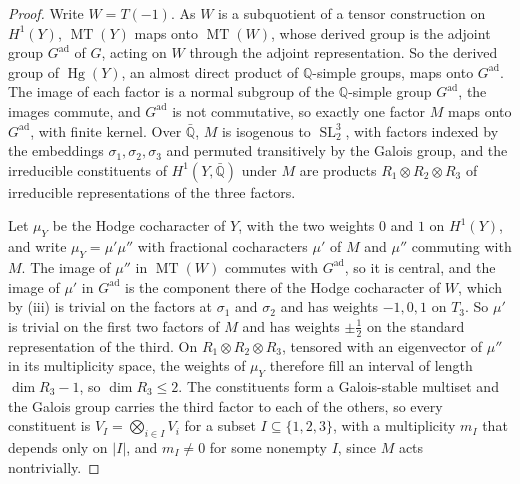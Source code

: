 \documentclass[11pt,reqno]{amsart}
\theoremstyle{plain}
\theoremstyle{definition}
\theoremstyle{remark}
\newcommand{\QQ}{\mathbb{Q}}
\DeclareMathOperator{\MT}{MT}
\DeclareMathOperator{\Hg}{Hg}
\DeclareMathOperator{\SL}{SL}
\begin{document}
\begin{proof}
Write $W=T(-1)$. As $W$ is a subquotient of a tensor construction on
$H^{1}(Y)$, $\MT(Y)$ maps onto $\MT(W)$, whose derived group is the adjoint
group $G^{\mathrm{ad}}$ of $G$, acting on $W$ through the adjoint
representation. So the derived group of $\Hg(Y)$, an almost direct product of
$\QQ$-simple groups, maps onto $G^{\mathrm{ad}}$. The image of each factor is
a normal subgroup of the $\QQ$-simple group $G^{\mathrm{ad}}$, the images
commute, and $G^{\mathrm{ad}}$ is not commutative, so exactly one factor $M$
maps onto $G^{\mathrm{ad}}$, with finite kernel. Over $\bar{\QQ}$, $M$ is
isogenous to $\SL_{2}^{3}$, with factors indexed by the embeddings
$\sigma_{1},\sigma_{2},\sigma_{3}$ and permuted transitively by the Galois
group, and the irreducible constituents of $H^{1}(Y,\bar{\QQ})$ under $M$ are
products $R_{1}\otimes R_{2}\otimes R_{3}$ of irreducible representations of
the three factors.

Let $\mu_{Y}$ be the Hodge cocharacter of $Y$, with the two weights $0$ and
$1$ on $H^{1}(Y)$, and write $\mu_{Y}=\mu'\mu''$ with fractional cocharacters
$\mu'$ of $M$ and $\mu''$ commuting with $M$. The image of $\mu''$ in
$\MT(W)$ commutes with $G^{\mathrm{ad}}$, so it is central, and the image of
$\mu'$ in $G^{\mathrm{ad}}$ is the component there of the Hodge cocharacter of
$W$, which by (iii) is trivial on the factors at
$\sigma_{1}$ and $\sigma_{2}$ and has weights $-1,0,1$ on $T_{3}$. So $\mu'$
is trivial on the first two factors of $M$ and has weights $\pm\frac12$ on
the standard representation of the third. On
$R_{1}\otimes R_{2}\otimes R_{3}$, tensored with an eigenvector of $\mu''$
in its multiplicity space, the weights of $\mu_{Y}$ therefore fill an
interval of length $\dim R_{3}-1$, so
$\dim R_{3}\le2$. The constituents form a Galois-stable multiset and the
Galois group carries the third factor to each of the others, so every
constituent is $V_{I}=\bigotimes_{i\in I}V_{i}$ for a subset
$I\subseteq\{1,2,3\}$, with a multiplicity $m_{I}$ that depends only on $|I|$,
and $m_{I}\ne0$ for some nonempty $I$, since $M$ acts nontrivially.


\end{proof}
\end{document}
